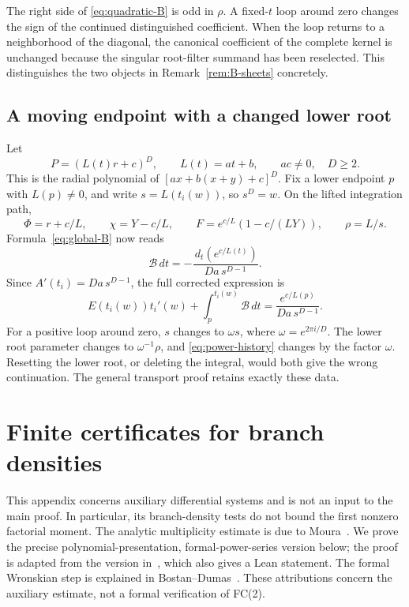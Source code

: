\documentclass[11pt]{article}
\numberwithin{equation}{section}
\theoremstyle{definition}\newtheorem{definition}[theorem]{Definition}
\theoremstyle{remark}\newtheorem{remark}[theorem]{Remark}
\newcommand{\dd}{\,d}
\begin{document}
The right side of \eqref{eq:quadratic-B} is odd in $\rho$. A fixed-$t$
loop around zero changes the sign of the continued distinguished
coefficient. When the loop returns to a neighborhood of the diagonal,
the canonical coefficient of the complete kernel is unchanged because
the singular root-filter summand has been reselected. This distinguishes
the two objects in Remark~\ref{rem:B-sheets} concretely.

\subsection{A moving endpoint with a changed lower root}
Let
\[
 P=(L(t)r+c)^D,\qquad L(t)=at+b,\qquad ac\ne0,\quad D\ge2.
\]
This is the radial polynomial of $[ax+b(x+y)+c]^D$.
Fix a lower endpoint $p$ with $L(p)\ne0$, and write
$s=L(t_i(w))$, so $s^D=w$. On the lifted integration path,
\[
 \Phi=r+c/L,\qquad \chi=Y-c/L,\qquad
 F=e^{c/L}(1-c/(LY)),\qquad \rho=L/s.
\]
Formula~\eqref{eq:global-B} now reads
\[
 \mathscr B\dd t=-\frac{\dd_t(e^{c/L(t)})}{Da\,s^{D-1}}.
\]
Since $A'(t_i)=Da\,s^{D-1}$, the full corrected expression is
\begin{equation}\label{eq:power-history}
 E(t_i(w))t_i'(w)+\int_p^{t_i(w)}\mathscr B\dd t
       =\frac{e^{c/L(p)}}{Da\,s^{D-1}}.
\end{equation}
For a positive loop around zero, $s$ changes to $\omega s$, where
$\omega=e^{2\pi i/D}$. The lower root parameter changes to
$\omega^{-1}\rho$, and \eqref{eq:power-history} changes by the factor
$\omega$. Resetting the lower root, or deleting the integral, would
both give the wrong continuation. The general transport proof retains
exactly these data.

\section{Finite certificates for branch densities}\label{app:certificates}
This appendix concerns auxiliary differential systems and is not an
input to the main proof. In particular, its branch-density tests do not
bound the first nonzero factorial moment. The analytic multiplicity
estimate is due to Moura~\cite{Moura,MouraHyper}. We prove the precise
polynomial-presentation, formal-power-series version below; the proof
is adapted from the version in~\cite{OAIMultiplicity}, which also gives
a Lean statement. The formal Wronskian step is explained in
Bostan--Dumas~\cite{BostanDumas}. These attributions concern the auxiliary
estimate, not a formal verification of FC(2).
\end{document}
